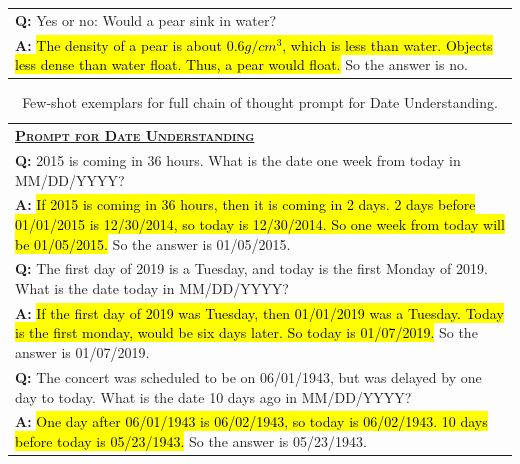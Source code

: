 \documentclass[]{article}
\theoremstyle{plain}
\theoremstyle{definition}
\theoremstyle{remark}
\begin{document}
\begin{table}[H]
\begin{tabular}{p{\linewidth}}
        \vspace{0mm}
        \textbf{Q:} Yes or no: Would a pear sink in water? \\
        \vspace{-1mm}
        \textbf{A:} \hl{The density of a pear is about $0.6 g/cm^3$, which is less than water. Objects less dense than water float. Thus, a pear would float.} So the answer is no. \\
        \bottomrule
    \end{tabular}
    \label{tab:appendix-strategyqa-prompt}
\end{table}
\endgroup
\begingroup
\begin{table}[H]
    \caption{    
    Few-shot exemplars for full chain of thought prompt for Date Understanding.
    }
    \centering
    \small
    \begin{tabular}{p{\linewidth}}
        \toprule
        \underline{\textbf{\textsc{Prompt for Date Understanding}}} \\
        \vspace{-2mm}
        \textbf{Q:} 2015 is coming in 36 hours. What is the date one week from today in MM/DD/YYYY? \\
        \vspace{-1mm}
        \textbf{A:} \hl{If 2015 is coming in 36 hours, then it is coming in 2 days. 2 days before 01/01/2015 is 12/30/2014, so today is 12/30/2014. So one week from today will be 01/05/2015.} So the answer is 01/05/2015. \\
        \vspace{0mm}
        \textbf{Q:} The first day of 2019 is a Tuesday, and today is the first Monday of 2019. What is the date today in MM/DD/YYYY? \\
        \vspace{-1mm}
        \textbf{A:} \hl{If the first day of 2019 was Tuesday, then 01/01/2019 was a Tuesday. Today is the first monday, would be six days later. So today is 01/07/2019.}  So the answer is 01/07/2019.\\
        \vspace{0mm}
        \textbf{Q:}  The concert was scheduled to be on 06/01/1943, but was delayed by one day to today. What is the date 10 days ago in MM/DD/YYYY? \\
        \vspace{-1mm}
        \textbf{A:} \hl{One day after 06/01/1943 is 06/02/1943, so today is 06/02/1943. 10 days before today is 05/23/1943.} So the answer is 05/23/1943. \\

\end{tabular}
\end{table}
\end{document}
